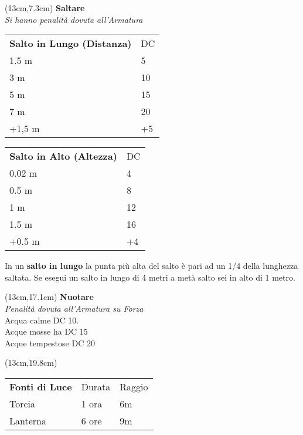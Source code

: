 \documentclass[a4paper,12 pt,openany]{book}
\begin{document}
\begin{textblock*}{7cm}(13cm,7.3cm) %
\textbf{Saltare}\\
\textit{Si hanno penalità dovuta all'Armatura}

\begin{tabular}{ll}
	\textbf{Salto in Lungo (Distanza)} & DC\\
	1.5 m                              & 5  \\
	3 m                                & 10\\
	5 m                                & 15 \\
	7 m                                & 20 \\
	+1,5 m                             & +5	\\
\end{tabular}

\begin{tabular}{ll}
\textbf{Salto in Alto (Altezza)} & DC\\
	0.02 m                           & 4\\
	0.5 m                            & 8\\
	1 m                              & 12\\
	1.5 m                            & 16\\
	+0.5 m                           & +4\\
\end{tabular}

In un \textbf{salto in lungo} la punta più alta del salto è pari ad un 1/4 della lunghezza saltata. Se esegui un salto in lungo di 4 metri a metà salto sei in alto di 1 metro.

\end{textblock*}

\begin{textblock*}{7cm}(13cm,17.1cm) %
\textbf{Nuotare}\\
\textit{Penalità dovuta all'Armatura su Forza}\\
Acqua calme DC 10.\\
Acque mosse ha DC 15\\
Acque tempestose DC 20
\end{textblock*}

\begin{textblock*}{7cm}(13cm,19.8cm) %

\begin{tabular}{lll}
\textbf{Fonti di Luce} & Durata&Raggio\\
Torcia& 1 ora & 6m\\
Lanterna & 6 ore & 9m\\
\end{tabular}

\end{textblock*}
\end{document}
